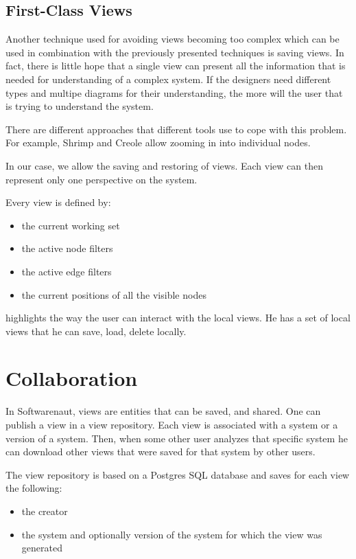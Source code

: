 \documentclass[preprint,12pt]{elsarticle}
\begin{document}
\newpage
\subsection {First-Class Views}

Another technique used for avoiding views becoming too complex which can be used in combination with the previously presented techniques is saving views. In fact, there is little hope that a single view can present all the information that is needed for understanding of a complex system. If the designers need different types and multipe diagrams for their understanding, the more will the user that is trying to understand the system. 

There are different approaches that different tools use to cope with this problem. For example, Shrimp and Creole allow zooming in into individual nodes. 

In our case, we allow the saving and restoring of views. Each view can then represent only one perspective on the system. 

Every view is defined by:

\begin{itemize}
\item the current working set
\item the active node filters
\item the active edge filters
\item the current positions of all the visible nodes
\end{itemize}

 highlights the way the user can interact with the local views. He has a set of local views that he can save, load, delete locally. 


\newpage
\section {Collaboration}
\label {sec:collab}

In Softwarenaut, views are entities that can be saved, and shared. One can publish a view in a view repository. Each view is associated with a system or a version of a system. Then, when some other user analyzes that specific system he can download other views that were saved for that system by other users. 

The view repository is based on a Postgres SQL database and saves for each view the following:

\begin{itemize}
\item the creator
\item the system and optionally version of the system for which the view was generated
\end{itemize}
\end{document}
